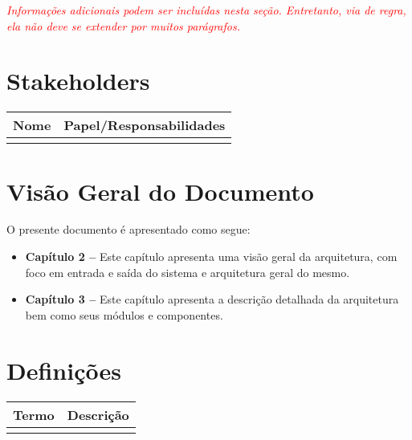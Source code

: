 \documentclass{report}
\begin{document}
  \noindent \textcolor{red}{\textit{Informações adicionais podem ser incluídas nesta seção. Entretanto, via de regra, ela não deve se extender por muitos parágrafos.}}

  \section{Stakeholders}
    \FloatBarrier
    \begin{table}[H] 
      \begin{center}
        \begin{tabular}[pos]{|m{6cm} | m{8cm}|} 
          \hline 
          \cellcolor[gray]{0.9}\textbf{Nome} & \cellcolor[gray]{0.9}\textbf{Papel/Responsabilidades} \\ \hline
           &  \\ \hline
        \end{tabular}
      \end{center}
    \end{table} 

\section{Visão Geral do Documento}

O presente documento é apresentado como segue:\\

  \begin{itemize}
   \item \textbf{Capítulo 2 --} Este capítulo apresenta uma visão geral da arquitetura, com foco em entrada e saída do sistema e arquitetura geral do mesmo.
   \item \textbf{Capítulo 3 --} Este capítulo apresenta a descrição detalhada da arquitetura bem como seus módulos e componentes.
  \end{itemize}


  \section{Definições}
    \FloatBarrier
    \begin{table}[H]
      \begin{center}
        \begin{tabular}[pos]{|m{5cm} | m{9cm}|} 
          \hline
          \cellcolor[gray]{0.9}\textbf{Termo} & \cellcolor[gray]{0.9}\textbf{Descrição} \\ \hline
                          &                       \\ \hline
        \end{tabular}
      \end{center}
    \end{table}  
\end{document}
